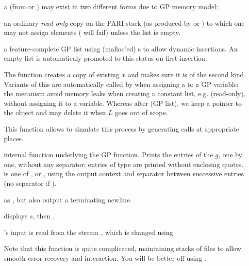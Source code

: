  a  (from  or ) may
exist in two different forms due to GP memory model:

\item an ordinary \emph{read-only} copy on the PARI stack (as produced by
 or ) to which one may not assign elements
( will fail) unless the list is empty.

\item a feature-complete GP list using (malloc'ed) s to
allow dynamic insertions. An empty list is automaticaly promoted to this
status on first insertion.

The  function creates a copy of existing  $x$ and
makes sure it is of the second kind. Variants of this are automatically
called by  when assigning a  to a GP variable; the
mecanism avoid memory leaks when creating a constant list, e.g.
 (read-only), without assigning it to a variable. Whereas
after  (GP list), we keep a pointer to the object and
may delete it when $L$ goes out of scope.

This  function allows  to simulate this process by
generating  calls at appropriate places.


internal function underlying the
 GP function. Prints the entries of the  $g$, one by one,
without any separator; entries of type  are printed without enclosing
quotes. \fl is one of ,  or , using the
output context  and separator  between
successive entries (no separator if ).

 as
, but also output a terminating newline.

 displays $s$,
then .


's input is read from the stream , which is changed
using


Note that this function is quite complicated, maintaining stacks of files
to allow smooth error recovery and  interaction. You will be better
off using .

